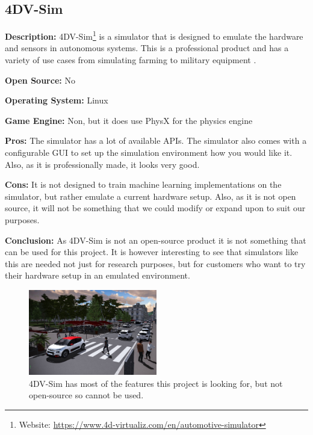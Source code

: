 \subsection{4DV-Sim}
\textbf{Description:} 4DV-Sim\footnote{Website: \url{https://www.4d-virtualiz.com/en/automotive-simulator}} is a simulator that is designed to emulate the hardware and sensors in autonomous systems. This is a professional product and has a variety of use cases from simulating farming to military equipment \cite{4dv-simulator}.

\textbf{Open Source:} No

\textbf{Operating System:} Linux

\textbf{Game Engine:} Non, but it does use PhysX for the physics engine

\textbf{Pros:} The simulator has a lot of available APIs. The simulator also comes with a configurable GUI to set up the simulation environment how you would like it. Also, as it is professionally made, it looks very good.   

\textbf{Cons:} It is not designed to train machine learning implementations on the simulator, but rather emulate a current hardware setup. Also, as it is not open source, it will not be something that we could modify or expand upon to suit our purposes. 

\textbf{Conclusion:} As 4DV-Sim is not an open-source product it is not something that can be used for this project. It is however interesting to see that simulators like this are needed not just for research purposes, but for customers who want to try their hardware setup in an emulated environment.


\begin{figure}[H]
    \centering
    \includegraphics[width=0.5\textwidth]{03_Background/Appendix/Simulators/4DV-Sim.jpg}
    \caption{4DV-Sim has most of the features this project is looking for, but not open-source so cannot be used.}
\end{figure}

